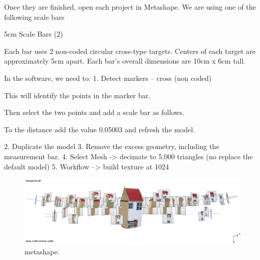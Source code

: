 \documentclass[acmlarge,screen,dvipsnames]{acmart}
\begin{document}
Once they are  finished, open each project in Metashape.
We are using one of the following scale bars

5cm Scale Bars (2)
 
Each bar uses 2 non-coded circular cross-type targets. Centers of each target are approximately 5cm apart. Each bar’s overall dimensions are 10cm x 6cm tall.

In the software, we need to:
1.  Detect markers – cross (non coded)
 

This will identify the points in the marker bar.
 
Then select  the two points and add a scale bar as follows.
 

To the distance add the value 0.05003 and refresh the model.
 

2.  Duplicate the model
3.  Remove the excess geometry, including the measurement bar.
4.  Select Mesh -> decimate to 5,000 triangles (no replace the default model)
5.  Workflow –> build texture at 1024





\begin{figure}[ht] \centering
\includegraphics[width=1\linewidth]{images/metashape.png}
\caption{metashape.} \label{fig:drawingmaps} 
\end{figure}
\end{document}
